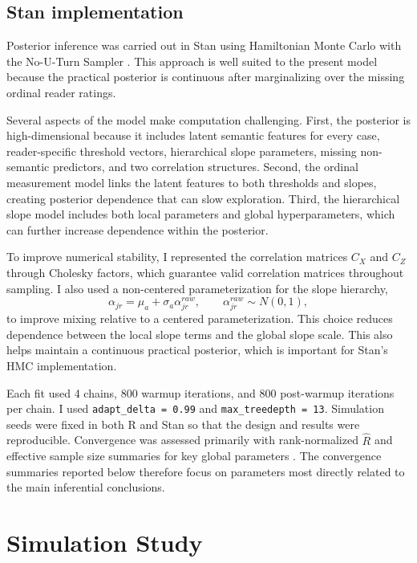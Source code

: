 \documentclass[twoside,11pt]{article}
\begin{document}
\subsection{Stan implementation}

Posterior inference was carried out in Stan using Hamiltonian Monte Carlo with the No-U-Turn Sampler \citep{HoffmanGelman2014,Stan2021}. This approach is well suited to the present model because the practical posterior is continuous after marginalizing over the missing ordinal reader ratings.

Several aspects of the model make computation challenging. First, the posterior is high-dimensional because it includes latent semantic features for every case, reader-specific threshold vectors, hierarchical slope parameters, missing non-semantic predictors, and two correlation structures. Second, the ordinal measurement model links the latent features to both thresholds and slopes, creating posterior dependence that can slow exploration. Third, the hierarchical slope model includes both local parameters and global hyperparameters, which can further increase dependence within the posterior.

To improve numerical stability, I represented the correlation matrices $C_X$ and $C_Z$ through Cholesky factors, which guarantee valid correlation matrices throughout sampling. I also used a non-centered parameterization for the slope hierarchy,
\[
\alpha_{jr} = \mu_a + \sigma_a \alpha_{jr}^{raw},
\qquad
\alpha_{jr}^{raw} \sim N(0,1),
\]
to improve mixing relative to a centered parameterization. This choice reduces dependence between the local slope terms and the global slope scale. This also helps maintain a continuous practical posterior, which is important for Stan's HMC implementation.

Each fit used 4 chains, 800 warmup iterations, and 800 post-warmup iterations per chain. I used \texttt{adapt\_delta = 0.99} and \texttt{max\_treedepth = 13}. Simulation seeds were fixed in both R and Stan so that the design and results were reproducible. Convergence was assessed primarily with rank-normalized $\hat R$ and effective sample size summaries for key global parameters \citep{Vehtari2021}. The convergence summaries reported below therefore focus on parameters most directly related to the main inferential conclusions.

\section{Simulation Study}
\end{document}
